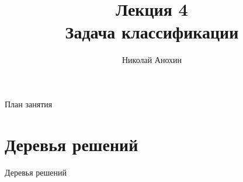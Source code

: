 \documentclass[10pt]{beamer}
\author{Николай Анохин}
\title{\newline \newline \newline Лекция 4 \\ Задача классификации}
\let\otp\titlepage
\renewcommand{\titlepage}{\otp\addtocounter{framenumber}{-1}}
\begin{document}
\begin{frame}[plain]
\titlepage
\end{frame}

\begin{frame}{План занятия}
\tableofcontents
\end{frame}

\section{Деревья решений}

\begin{frame}{}

\begin{center}
\Large Деревья решений
\end{center}

\end{frame}
\end{document}
